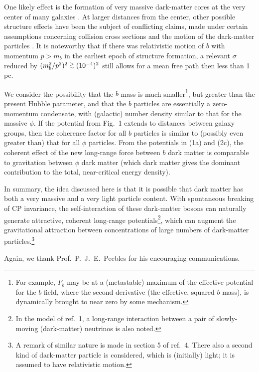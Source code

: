 One likely effect is the formation of very massive dark-matter cores at the very center of many galaxies \cite{ref9,ref10}.
At larger distances from the center, other possible structure effects have been the subject of conflicting claims, made
under certain assumptions concerning collision cross sections and the motion of the dark-matter particles
\cite{ref11,ref12,ref13,ref14}. It is noteworthy that if there was relativistic motion of $b$ with momentum
$p> m_b$ in the earliest epoch of structure formation, a relevant $\sigma$ reduced by $(m_b^2/p^2)^2 \stackrel{>}{{}_\sim} (10^{-4})^2$ still
allows for a mean free path then less than 1 pc.

We consider the possibility that the $b$ mass is much smaller\footnote{
For example, $F_b$ may be at a (metastable) maximum of the effective potential for the $b$ field, where the
second derivative (the effective, squared $b$ mass), is dynamically brought to near zero by some mechanism.
}, but greater than the present Hubble parameter, and
that the $b$ particles are essentially a zero-momentum condensate, with  (galactic) number density similar to that for
the massive $\phi$. If the potential from Fig.~1 extends to distances between galaxy groups, then the coherence factor
for all $b$ particles is similar to (possibly even greater than) that for all $\phi$ particles. From the potentials 
in (1a) and (2c), the coherent effect of the new long-range force between $b$ dark matter is comparable to 
gravitation between $\phi$ dark matter (which dark matter gives the dominant contribution to the total, near-critical
energy density).

In summary, the idea discussed here is that it is possible that dark matter has both a very massive and a very light
particle content. With spontaneous breaking of CP invariance, the self-interaction of these dark-matter bosons can naturally
generate attractive, coherent long-range potentials\footnote{In the model of ref.~1, a long-range interaction between
a pair of slowly-moving (dark-matter) neutrinos is also noted.}, which can augment the gravitational attraction
between concentrations of large numbers of dark-matter particles.\footnote{A  remark of similar nature is made in section 5
of ref.~4. There  also a second kind of dark-matter particle is considered, which is (initially) light; it is assumed
to have relativistic motion. } 

Again, we thank Prof.~P.~J.~E.~Peebles for his encouraging communications.

